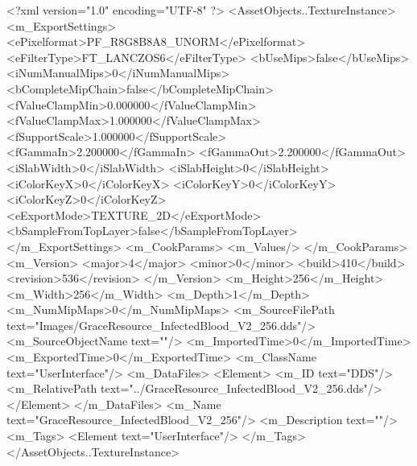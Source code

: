 <?xml version="1.0" encoding="UTF-8" ?>
<AssetObjects..TextureInstance>
	<m_ExportSettings>
		<ePixelformat>PF_R8G8B8A8_UNORM</ePixelformat>
		<eFilterType>FT_LANCZOS6</eFilterType>
		<bUseMips>false</bUseMips>
		<iNumManualMips>0</iNumManualMips>
		<bCompleteMipChain>false</bCompleteMipChain>
		<fValueClampMin>0.000000</fValueClampMin>
		<fValueClampMax>1.000000</fValueClampMax>
		<fSupportScale>1.000000</fSupportScale>
		<fGammaIn>2.200000</fGammaIn>
		<fGammaOut>2.200000</fGammaOut>
		<iSlabWidth>0</iSlabWidth>
		<iSlabHeight>0</iSlabHeight>
		<iColorKeyX>0</iColorKeyX>
		<iColorKeyY>0</iColorKeyY>
		<iColorKeyZ>0</iColorKeyZ>
		<eExportMode>TEXTURE_2D</eExportMode>
		<bSampleFromTopLayer>false</bSampleFromTopLayer>
	</m_ExportSettings>
	<m_CookParams>
		<m_Values/>
	</m_CookParams>
	<m_Version>
		<major>4</major>
		<minor>0</minor>
		<build>410</build>
		<revision>536</revision>
	</m_Version>
	<m_Height>256</m_Height>
	<m_Width>256</m_Width>
	<m_Depth>1</m_Depth>
	<m_NumMipMaps>0</m_NumMipMaps>
	<m_SourceFilePath text="Images/GraceResource_InfectedBlood_V2_256.dds"/>
	<m_SourceObjectName text=""/>
	<m_ImportedTime>0</m_ImportedTime>
	<m_ExportedTime>0</m_ExportedTime>
	<m_ClassName text="UserInterface"/>
	<m_DataFiles>
		<Element>
			<m_ID text="DDS"/>
			<m_RelativePath text="../GraceResource_InfectedBlood_V2_256.dds"/>
		</Element>
	</m_DataFiles>
	<m_Name text="GraceResource_InfectedBlood_V2_256"/>
	<m_Description text=""/>
	<m_Tags>
		<Element text="UserInterface"/>
	</m_Tags>
</AssetObjects..TextureInstance>
